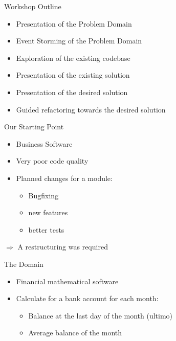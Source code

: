 
\begin{frame}[fragile]{Workshop Outline}
\begin{itemize}
\item Presentation of the Problem Domain
\item Event Storming of the Problem Domain
\item Exploration of the existing codebase
\item Presentation of the existing solution
\item Presentation of the desired solution
\item Guided refactoring towards the desired solution
\end{itemize}

\end{frame}


\begin{frame}[fragile]{Our Starting Point}
\begin{itemize}
\item Business Software
\item Very poor code quality
\item Planned changes for a module:
\begin{itemize}
\item Bugfixing
\item new features
\item better tests
\end{itemize}
\end{itemize}

$\Rightarrow$ A restructuring was required
\end{frame}

\begin{frame}[fragile]{The Domain}
\begin{itemize}
\item Financial mathematical software
\end{itemize}

\begin{itemize}
\item Calculate for a bank account for each month:
\begin{itemize}
\item Balance at the last day of the month (ultimo)
\item Average balance of the month
\end{itemize}
\end{itemize}

\end{frame}



